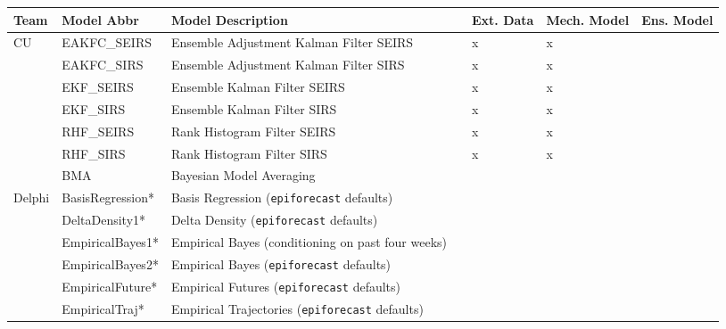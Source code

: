 \begin{table*}
\setlength{\tabcolsep}{4pt} 
\begin{tabular}{p{1.6cm} l p{7.5cm} l  p{1cm}  p{1cm} p{1cm}}
\hline
Team     & Model Abbr& Model Description & & Ext. Data & Mech. Model & Ens. Model \\ 
\hline
CU       & EAKFC\_SEIRS       & Ensemble Adjustment Kalman Filter SEIRS & \cite{Pei2017}  & x & x & \\ 

~        & EAKFC\_SIRS        & Ensemble Adjustment Kalman Filter SIRS & \cite{Pei2017}  & x & x & \\
~        & EKF\_SEIRS         & Ensemble Kalman Filter SEIRS & \cite{Yang2014}    & x             & x &                    \\
~        & EKF\_SIRS          & Ensemble Kalman Filter SIRS & \cite{Yang2014}     & x             & x   &                 \\
~        & RHF\_SEIRS         & Rank Histogram Filter SEIRS & \cite{Yang2014}    & x             & x     &               \\
~        & RHF\_SIRS          & Rank Histogram Filter SIRS & \cite{Yang2014}     & x             & x       &             \\
~        & BMA                & Bayesian Model Averaging & \cite{Yamana2017}      & ~             & ~          &          \\
\hline
Delphi   & BasisRegression*    & Basis Regression ({\tt epiforecast} defaults) & \cite{Brooks2015a} & ~             & ~     &               \\ 
~        & DeltaDensity1*      & Delta Density ({\tt epiforecast} defaults)   & \cite{Brooks2018} & ~             & ~       &             \\ 
~        & EmpiricalBayes1*    & Empirical Bayes (conditioning on past four weeks) & \cite{Brooks2015,Brooks2015a} & ~             & ~  &                  \\ 
~        & EmpiricalBayes2*    & Empirical Bayes ({\tt epiforecast} defaults) & \cite{Brooks2015,Brooks2015a} & ~             & ~            &        \\ 
~        & EmpiricalFuture*    & Empirical Futures ({\tt epiforecast} defaults) &  \cite{Brooks2015a} & ~             & ~         &           \\ 
~        & EmpiricalTraj*      & Empirical Trajectories ({\tt epiforecast} defaults)& \cite{Brooks2015a} & ~             & ~         &           \\ 

\end{tabular}
\end{table*}
